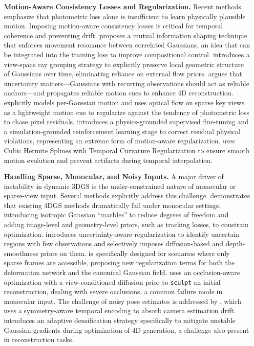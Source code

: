 \documentclass[11pt]{article}
\begin{document}
\textbf{Motion-Aware Consistency Losses and Regularization.} Recent methods emphasize that photometric loss alone is insufficient to learn physically plausible motion. Imposing motion-aware consistency losses is critical for temporal coherence and preventing drift. \cite{ref382} proposes a mutual information shaping technique that enforces movement resonance between correlated Gaussians, an idea that can be integrated into the training loss to improve compositional control. \cite{ref383} introduces a view-space ray grouping strategy to explicitly preserve local geometric structure of Gaussians over time, eliminating reliance on external flow priors. \cite{ref384} argues that uncertainty matters---Gaussians with recurring observations should act as reliable anchors---and propagates reliable motion cues to enhance 4D reconstruction. \cite{ref385} explicitly models per-Gaussian motion and uses optical flow on sparse key views as a lightweight motion cue to regularize against the tendency of photometric loss to chase pixel residuals. \cite{ref386} introduces a physics-grounded supervised fine-tuning and a simulation-grounded reinforcement learning stage to correct residual physical violations, representing an extreme form of motion-aware regularization. \cite{ref387} uses Cubic Hermite Splines with Temporal Curvature Regularization to ensure smooth motion evolution and prevent artifacts during temporal interpolation.

\textbf{Handling Sparse, Monocular, and Noisy Inputs.} A major driver of instability in dynamic 3DGS is the under-constrained nature of monocular or sparse-view input. Several methods explicitly address this challenge. \cite{ref378} demonstrates that existing 4DGS methods dramatically fail under monocular settings, introducing isotropic Gaussian ``marbles'' to reduce degrees of freedom and adding image-level and geometry-level priors, such as tracking losses, to constrain optimization. \cite{ref381} introduces uncertainty-aware regularization to identify uncertain regions with few observations and selectively imposes diffusion-based and depth-smoothness priors on them. \cite{ref380} is specifically designed for scenarios where only sparse frames are accessible, proposing new regularization terms for both the deformation network and the canonical Gaussian field. \cite{ref388} uses an occlusion-aware optimization with a view-conditioned diffusion prior to \texttt{sculpt} an initial reconstruction, dealing with severe occlusions, a common failure mode in monocular input. The challenge of noisy pose estimates is addressed by \cite{ref389}, which uses a symmetry-aware temporal encoding to absorb camera estimation drift. \cite{ref390} introduces an adaptive densification strategy specifically to mitigate unstable Gaussian gradients during optimization of 4D generation, a challenge also present in reconstruction tasks.
\end{document}
